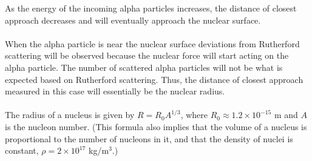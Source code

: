 \documentclass[a4paper,12pt]{article}
\begin{document}
As the energy of the incoming alpha particles increases, the distance of closest approach decreases and will eventually approach the nuclear surface. \\\\
When the alpha particle is near the nuclear surface deviations from Rutherford scattering will be observed because the nuclear force will start acting on the alpha particle. The number of scattered alpha particles will not be what is expected based on Rutherford scattering. Thus, the distance of closest approach measured in this case will essentially be the nuclear radius.\\\\
The radius of a nucleus is given by $R=R_0 A^{1/3}$, where $R_0\approx 1.2\times 10^{-15}$ m and $A$ is the nucleon number. (This formula also implies that the volume of a nucleus is proportional to the number of nucleons in it, and that the density of nuclei is constant, $\rho=2\times 10^{17}$ kg/m$^3$.)
\end{document}
